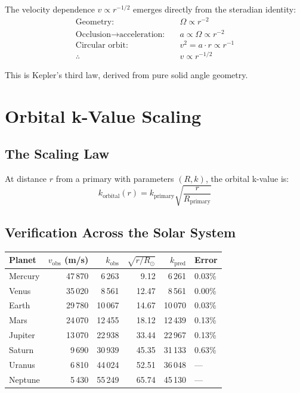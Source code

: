 The velocity dependence $v \propto r^{-1/2}$ emerges directly from the steradian identity:
\begin{align}
  \text{Geometry:} &\quad \Omega \propto r^{-2} \label{eq:chain1}\\
  \text{Occlusion} \to \text{acceleration:} &\quad a \propto \Omega \propto r^{-2} \\
  \text{Circular orbit:} &\quad v^2 = a \cdot r \propto r^{-1} \\
  \therefore \quad &\quad v \propto r^{-1/2} \label{eq:chain4}
\end{align}

This is Kepler's third law, derived from pure solid angle geometry.


\section{Orbital k-Value Scaling}

\subsection{The Scaling Law}

At distance $r$ from a primary with parameters $(R, k)$, the orbital k-value is:
\begin{equation}\label{eq:k-scaling}
  k_{\text{orbital}}(r) = k_{\text{primary}} \sqrt{\frac{r}{R_{\text{primary}}}}
\end{equation}

\subsection{Verification Across the Solar System}

\begin{center}
\begin{tabular}{lrrrrl}
\hline
\textbf{Planet} & $v_{\text{obs}}$ (m/s) & $k_{\text{obs}}$ & $\sqrt{r/R_\odot}$ & $k_{\text{pred}}$ & \textbf{Error} \\
\hline
Mercury  & 47\,870 & 6\,263  & 9.12  & 6\,261  & 0.03\% \\
Venus    & 35\,020 & 8\,561  & 12.47 & 8\,561  & 0.00\% \\
Earth    & 29\,780 & 10\,067 & 14.67 & 10\,070 & 0.03\% \\
Mars     & 24\,070 & 12\,455 & 18.12 & 12\,439 & 0.13\% \\
Jupiter  & 13\,070 & 22\,938 & 33.44 & 22\,967 & 0.13\% \\
Saturn   & 9\,690  & 30\,939 & 45.35 & 31\,133 & 0.63\% \\
Uranus   & 6\,810  & 44\,024 & 52.51 & 36\,048 & --- \\
Neptune  & 5\,430  & 55\,249 & 65.74 & 45\,130 & --- \\
\hline
\end{tabular}
\end{center}

